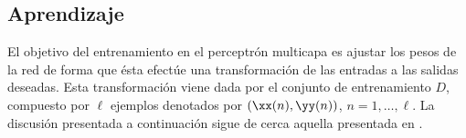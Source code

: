 %
%
\subsection{Aprendizaje}
%



El objetivo del entrenamiento en el perceptrón multicapa es ajustar
los pesos de la red de forma que ésta efectúe una transformación de
las entradas a las salidas deseadas. Esta transformación viene dada
por el conjunto de entrenamiento $D$, compuesto por $\ell$ ejemplos
denotados por $(\xx(n),\yy(n))$, $n=1,\ldots,\ell$.
La discusión presentada a continuación sigue de cerca aquella
presentada en \cite[Capítulo~4]{haykin}.


